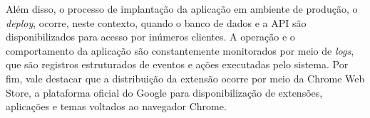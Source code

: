 Além disso, o processo de implantação da aplicação em ambiente de produção, o \textit{deploy}, ocorre, neste contexto, quando o banco de dados e a API são disponibilizados para acesso por inúmeros clientes. A operação e o comportamento da aplicação são constantemente monitorados por meio de \textit{logs}, que são registros estruturados de eventos e ações executadas pelo sistema. Por fim, vale destacar que a distribuição da extensão ocorre por meio da Chrome Web Store, a plataforma oficial do Google para disponibilização de extensões, aplicações e temas voltados ao navegador Chrome.